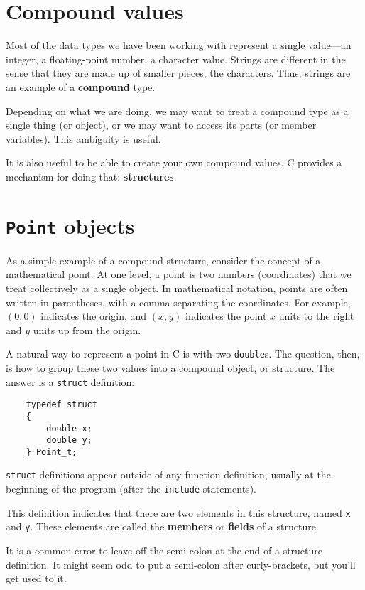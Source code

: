 \section{Compound values}

Most of the data types we have been working with represent a single
value---an integer, a floating-point number, a character value. 
Strings are different in the sense that they are made up of smaller
pieces, the characters.  Thus, strings are an example of a
{\bf compound} type. 

Depending on what we are doing, we may want to treat a compound type
as a single thing (or object), or we may want to access its parts (or
member variables).  This ambiguity is useful.

It is also useful to be able to create your own compound values.  
C provides a mechanism for doing that: {\bf structures}.  

\section{{\tt Point} objects}

As a simple example of a compound structure, consider the concept of a
mathematical point.  At one level, a point is two numbers
(coordinates) that we treat collectively as a single object.  In
mathematical notation, points are often written in parentheses, with a
comma separating the coordinates.  For example, $(0, 0)$ indicates the
origin, and $(x, y)$ indicates the point $x$ units to the right and
$y$ units up from the origin.

A natural way to represent a point in C is with two {\tt double}s.
The question, then, is how to group these two values into
a compound object, or structure.  The answer is a {\tt struct}
definition:

\begin{verbatim}
	typedef struct 
	{
		double x;
		double y;
	} Point_t;  
\end{verbatim}
%
{\tt struct} definitions appear outside of any function definition,
usually at the beginning of the program (after the {\tt include}
statements).

This definition indicates that there are two elements in this
structure, named {\tt x} and {\tt y}.  These elements are called
the {\bf members} or {\bf fields} of a structure.

It is a common error to leave off the semi-colon at the end of a
structure definition.  It might seem odd to put a semi-colon after
curly-brackets, but you'll get used to it.


